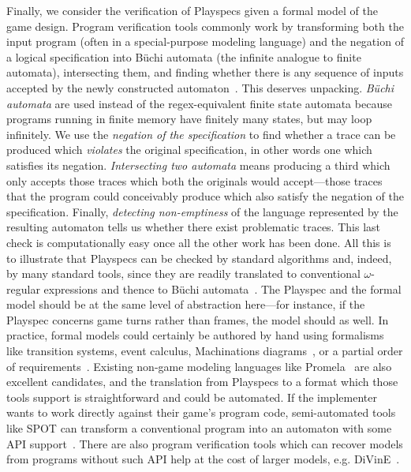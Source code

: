 \documentclass[letterpaper]{article}
\begin{document}
Finally, we consider the verification of Playspecs given a formal model of the game design. Program verification tools commonly work by transforming both the input program (often in a special-purpose modeling language) and the negation of a logical specification into B\"{u}chi automata (the infinite analogue to finite automata), intersecting them, and finding whether there is any sequence of inputs accepted by the newly constructed automaton~\cite{courcoubetis1993memory}. This deserves unpacking. \emph{B\"{u}chi automata} are used instead of the regex-equivalent finite state automata because programs running in finite memory have finitely many states, but may loop infinitely. We use the \emph{negation of the specification} to find whether a trace can be produced which \emph{violates} the original specification, in other words one which satisfies its negation. \emph{Intersecting two automata} means producing a third which only accepts those traces which both the originals would accept---those traces that the program could conceivably produce which also satisfy the negation of the specification. Finally, \emph{detecting non-emptiness} of the language represented by the resulting automaton tells us whether there exist problematic traces. This last check is computationally easy once all the other work has been done.
%
All this is to illustrate that Playspecs can be checked by standard algorithms and, indeed, by many standard tools, since they are readily translated to conventional $\omega$-regular expressions and thence to B\"{u}chi automata~\cite{holzmann1997model,cimatti2000nusmv,duret2004spot}. The Playspec and the formal model should be at the same level of abstraction here---for instance, if the Playspec concerns game turns rather than frames, the model should as well.
In practice, formal models could certainly be authored by hand using formalisms like transition systems, event calculus, Machinations diagrams~\cite{dormans2009machinations}, or a partial order of requirements~\cite{van2013designing}. Existing non-game modeling languages like Promela~\cite{holzmann1993design} are also excellent candidates, and the translation from Playspecs to a format which those tools support is straightforward and could be automated. If the implementer wants to work directly against their game's program code, semi-automated tools like SPOT can transform a conventional program into an automaton with some API support~\cite{duret2004spot}. There are also program verification tools which can recover models from programs without such API help at the cost of larger models, e.g. DiVinE~\cite{barnat2013divine}.
\end{document}
